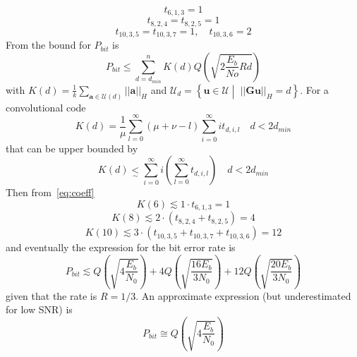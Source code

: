 \documentclass[10pt]{article}
\begin{document}
\begin{equation*}
	t_{6,1,3} = 1
\end{equation*}
\begin{equation}\label{eq:coeff}
	t_{8,2,4} = t_{8,2,5} = 1
\end{equation}
\begin{equation*}
	t_{10, 3, 5} = t_{10, 3, 7} = 1, \quad  t_{10,3,6} = 2
\end{equation*}
From \cite{erseghe} the bound for $P_{bit}$ is
\begin{equation}
	P_{bit} \le \sum_{d=d_{min}}^n K(d)Q\left(\sqrt{2\frac{E_b}{No}Rd}\right)
\end{equation}
with $K(d) = \frac{1}{k} \sum_{\mathbf{a}\in\mathcal{U}(d)} ||\mathbf{a}||_H$ and $\mathcal{U}_d = \left\{ \mathbf{u} \in \mathcal{U} \middle| \; ||\mathbf{Gu} ||_{H} = d \right\}$. For a convolutional code 
\begin{equation}
	K(d) = \frac{1}{\mu}\sum_{l=0}^{\infty} (\mu + \nu - l) \sum_{i=0}^{\infty} i t_{d,i,l} \quad d < 2d_{min}
\end{equation}
that can be upper bounded by
\begin{equation}
	K(d) \underset{\sim}{<} \sum_{i=0}^{\infty} i \left( \sum_{l=0}^{\infty}t_{d,i,l}\right) \quad d < 2d_{min}
\end{equation}
Then from~\eqref{eq:coeff} 
\begin{equation*}
	K(6) \lesssim 1\cdot t_{6,1,3} = 1
\end{equation*}
\begin{equation}
	K(8) \lesssim 2\cdot (t_{8,2,4} + t_{8,2,5}) = 4
\end{equation}
\begin{equation*}
	K(10) \lesssim 3\cdot (t_{10, 3, 5} + t_{10, 3, 7} + t_{10,3,6}) = 12
\end{equation*}
and eventually the expression for the bit error rate is
\begin{equation}\label{eq:BER_bound}
	P_{bit} \lesssim Q\left(\sqrt{4\frac{E_b}{N_0}} \right) + 4Q\left(\sqrt{\frac{16E_b}{3N_0}} \right) + 12Q\left(\sqrt{\frac{20E_b}{3N_0}} \right)
\end{equation}
given that the rate is $R=1/3$. An approximate expression (but underestimated for low SNR) is
\begin{equation}\label{eq:BER_approx}
	P_{bit} \cong Q\left(\sqrt{4\frac{E_b}{N_0}} \right)
\end{equation}
\end{document}

